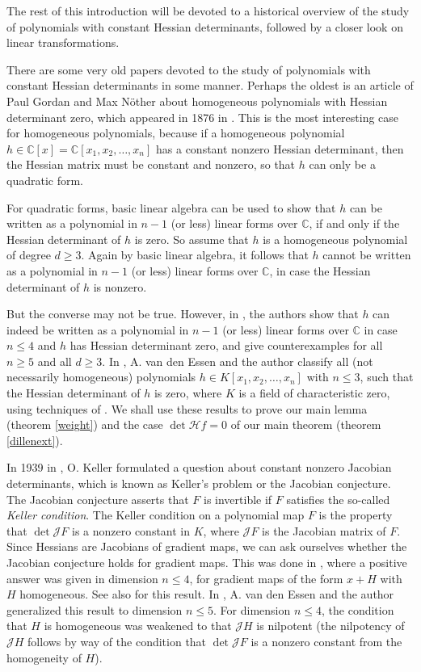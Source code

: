 \documentclass[10pt]{article}
\theoremstyle{remark}
\theoremstyle{definition}
\newcommand{\jac}{{\mathcal J}}
\newcommand{\hess}{{\mathcal H}}
\newcommand{\C}{{\mathbb C}}
\begin{document}
The rest of this introduction will be devoted to a historical overview of the study of
polynomials with constant Hessian determinants, followed by a closer look on linear transformations.

There are some very old papers devoted to the study of polynomials with constant Hessian determinants 
in some manner. Perhaps the oldest is an article of Paul Gordan and Max N{\"o}ther about homogeneous
polynomials with Hessian determinant zero, which appeared in 1876 in \cite{MR1509898}. 
This is the most interesting case for homogeneous 
polynomials, because if a homogeneous polynomial $h \in \C[x] = \C[x_1,x_2,\ldots,x_n]$ has a constant 
nonzero Hessian determinant, then the Hessian matrix must be constant and nonzero, so that $h$ can only
be a quadratic form.

For quadratic forms, basic linear algebra can be used 
to show that $h$ can be written as a polynomial in $n-1$ (or less) linear forms over $\C$, 
if and only if the Hessian determinant of $h$ is zero. So assume that $h$ is a homogeneous
polynomial of degree $d \ge 3$. Again by basic linear algebra, it follows that $h$ cannot be 
written as a polynomial in  $n-1$ (or less) linear forms over $\C$, in case the Hessian 
determinant of $h$ is nonzero.

But the converse may not be true. However, in \cite{MR1509898},
the authors show that $h$ can indeed be written as a polynomial in $n-1$ (or less) linear forms 
over $\C$ in case $n \le 4$ and $h$ has Hessian determinant zero, 
and give counterexamples for all $n \ge 5$ and all $d \ge 3$.
In \cite{MR2095579}, A. van den Essen and the author classify all (not necessarily homogeneous) 
polynomials $h \in K[x_1,x_2,\ldots,x_n]$ with $n \le 3$, such that the Hessian determinant of $h$ is zero,
where $K$ is a field of characteristic zero, using techniques of \cite{MR1509898}. 
We shall use these results to prove our main lemma (theorem \ref{weight}) and the 
case $\det \hess f = 0$ of our main theorem (theorem \ref{dillenext}).

In 1939 in \cite{MR1550818}, O. Keller formulated a question about constant nonzero Jacobian determinants, 
which is known as Keller's problem or the Jacobian conjecture. The Jacobian conjecture asserts that 
$F$ is invertible if $F$ satisfies the so-called \emph{Keller condition}. The Keller condition
on a polynomial map $F$ is the property that $\det \jac F$ is a nonzero constant in $K$,
where $\jac F$ is the Jacobian matrix of $F$. 
Since Hessians are Jacobians of gradient maps, we can ask ourselves whether 
the Jacobian conjecture holds for gradient maps. This was done in \cite{MR2038568}, where a positive 
answer was given in dimension $n \le 4$, for gradient maps of the form $x + H$ with $H$ homogeneous.
See also \cite{MR2076378} for this result. In \cite{MR2110519}, A. van den Essen and the author
generalized this result to dimension $n \le 5$. For dimension $n \le 4$, the condition that 
$H$ is homogeneous was weakened to that $\jac H$ is nilpotent (the nilpotency of
$\jac H$ follows by way of the condition that $\det \jac F$ is a nonzero constant
from the homogeneity of $H$).
\end{document}
